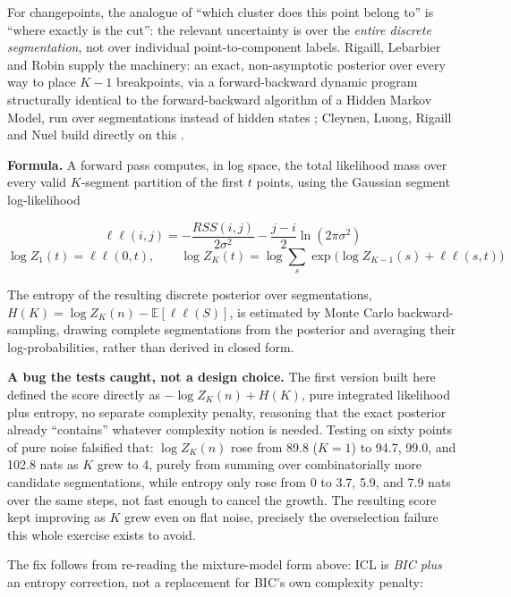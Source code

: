 \documentclass[11pt]{article}
\begin{document}
For changepoints, the analogue of ``which cluster does this point belong
to'' is ``where exactly is the cut'': the relevant uncertainty is over the
\emph{entire discrete segmentation}, not over individual point-to-component
labels. Rigaill, Lebarbier and Robin supply the machinery: an exact,
non-asymptotic posterior over every way to place $K-1$ breakpoints, via a
forward-backward dynamic program structurally identical to the
forward-backward algorithm of a Hidden Markov Model, run over segmentations
instead of hidden states \citeyearpar{rigaill2012}; Cleynen, Luong, Rigaill
and Nuel build directly on this \citeyearpar{cleynen2013}.

\textbf{Formula.} A forward pass computes, in log space, the total
likelihood mass over every valid $K$-segment partition of the first $t$
points, using the Gaussian segment log-likelihood

\begin{equation}
\ell\ell(i, j) = -\frac{RSS(i, j)}{2\sigma^2} - \frac{j - i}{2} \ln(2\pi\sigma^2)
\end{equation}
\begin{equation}
\log Z_1(t) = \ell\ell(0, t), \qquad \log Z_K(t) = \log \sum_{s} \exp\!\Big( \log Z_{K-1}(s) + \ell\ell(s, t) \Big)
\end{equation}

The entropy of the resulting discrete posterior over segmentations, $H(K) =
\log Z_K(n) - \mathbb{E}[\ell\ell(S)]$, is estimated by Monte Carlo
backward-sampling, drawing complete segmentations from the posterior and
averaging their log-probabilities, rather than derived in closed form.

\textbf{A bug the tests caught, not a design choice.} The first version
built here defined the score directly as $-\log Z_K(n) + H(K)$, pure
integrated likelihood plus entropy, no separate complexity penalty,
reasoning that the exact posterior already ``contains'' whatever complexity
notion is needed. Testing on sixty points of pure noise falsified that:
$\log Z_K(n)$ rose from 89.8 ($K=1$) to 94.7, 99.0, and 102.8 nats as $K$
grew to 4, purely from summing over combinatorially more candidate
segmentations, while entropy only rose from 0 to 3.7, 5.9, and 7.9 nats
over the same steps, not fast enough to cancel the growth. The resulting
score kept improving as $K$ grew even on flat noise, precisely the
overselection failure this whole exercise exists to avoid.

The fix follows from re-reading the mixture-model form above: ICL is
\emph{BIC plus} an entropy correction, not a replacement for BIC's own
complexity penalty:
\end{document}
